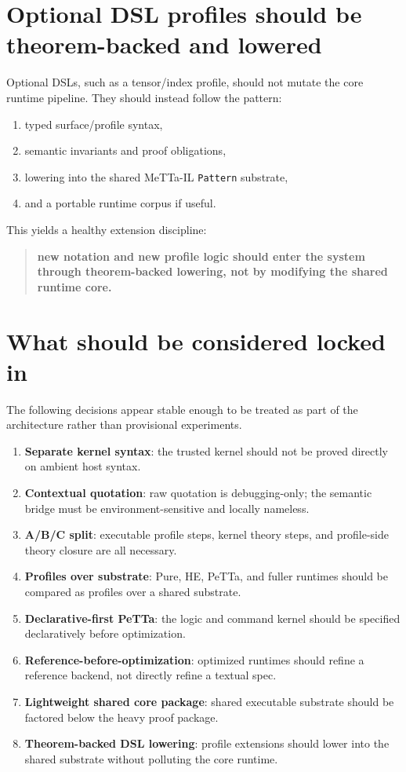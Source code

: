 \documentclass[11pt]{article}
\begin{document}
\section{Optional DSL profiles should be theorem-backed and lowered}

Optional DSLs, such as a tensor/index profile, should not mutate the core runtime pipeline. They should instead follow the pattern:
\begin{enumerate}
  \item typed surface/profile syntax,
  \item semantic invariants and proof obligations,
  \item lowering into the shared MeTTa-IL \texttt{Pattern} substrate,
  \item and a portable runtime corpus if useful.
\end{enumerate}

This yields a healthy extension discipline:
\begin{quote}
\textbf{new notation and new profile logic should enter the system through theorem-backed lowering, not by modifying the shared runtime core.}
\end{quote}

\section{What should be considered locked in}

The following decisions appear stable enough to be treated as part of the architecture rather than provisional experiments.

\begin{enumerate}
  \item \textbf{Separate kernel syntax}: the trusted kernel should not be proved directly on ambient host syntax.
  \item \textbf{Contextual quotation}: raw quotation is debugging-only; the semantic bridge must be environment-sensitive and locally nameless.
  \item \textbf{A/B/C split}: executable profile steps, kernel theory steps, and profile-side theory closure are all necessary.
  \item \textbf{Profiles over substrate}: Pure, HE, PeTTa, and fuller runtimes should be compared as profiles over a shared substrate.
  \item \textbf{Declarative-first PeTTa}: the logic and command kernel should be specified declaratively before optimization.
  \item \textbf{Reference-before-optimization}: optimized runtimes should refine a reference backend, not directly refine a textual spec.
  \item \textbf{Lightweight shared core package}: shared executable substrate should be factored below the heavy proof package.
  \item \textbf{Theorem-backed DSL lowering}: profile extensions should lower into the shared substrate without polluting the core runtime.
\end{enumerate}
\end{document}
